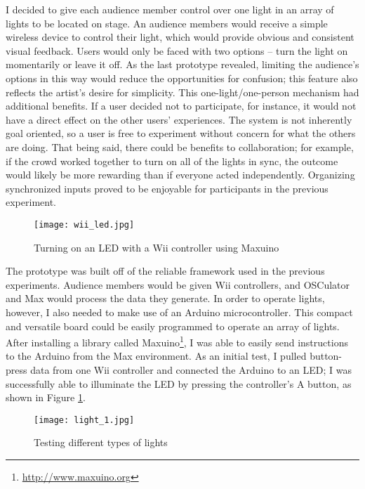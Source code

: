 I decided to give each audience member control over one light in an array of lights to be located on stage. An audience members would receive a simple wireless device to control their light, which would provide obvious and consistent visual feedback. Users would only be faced with two options -- turn the light on momentarily or leave it off. As the last prototype revealed, limiting the audience's options in this way would reduce the opportunities for confusion; this feature also reflects the artist's desire for simplicity. This one-light/one-person mechanism had additional benefits. If a user decided not to participate, for instance, it would not have a direct effect on the other users' experiences. The system is not inherently goal oriented, so a user is free to experiment without concern for what the others are doing. That being said, there could be benefits to collaboration; for example, if the crowd worked together to turn on all of the lights in sync, the outcome would likely be more rewarding than if everyone acted independently. Organizing synchronized inputs proved to be enjoyable for participants in the previous experiment.

\begin{figure}
	\centering

	\texttt{[image: wii\_led.jpg]}
	\caption{Turning on an LED with a Wii controller using Maxuino}

	\label{prototyping3.1}
\end{figure}

The prototype was built off of the reliable framework used in the previous experiments. Audience members would be given Wii controllers, and OSCulator and Max would process the data they generate. In order to operate lights, however, I also needed to make use of an Arduino microcontroller. This compact and versatile board could be easily programmed to operate an array of lights. After installing a library called Maxuino\footnote{\url{http://www.maxuino.org}}, I was able to easily send instructions to the Arduino from the Max environment. As an initial test, I pulled button-press data from one Wii controller and connected the Arduino to an LED; I was successfully able to illuminate the LED by pressing the controller's A button, as shown in Figure \ref{prototyping3.1}.

\begin{figure}
	\centering

	\texttt{[image: light\_1.jpg]}
	\caption{Testing different types of lights}

	\label{prototyping3.2}
\end{figure}

